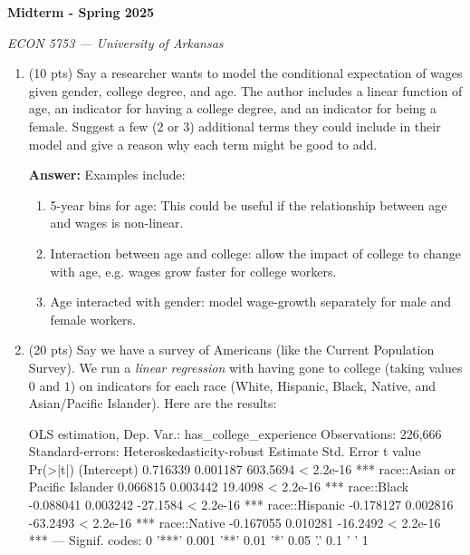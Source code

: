 \documentclass[12pt]{article}
\newcommand{\answer}[1]{{\color{blue_winged_teal}\textbf{Answer:} #1}}
\newcommand{\pts}[1]{{\color{zinc500}(#1 pts)}}
\begin{document}
\begin{center}
  {\Huge\bf Midterm - Spring 2025}

  \smallskip
  {\large\it ECON 5753 — University of Arkansas}
\end{center}

\medskip
\begin{enumerate}
  \item \pts{10} Say a researcher wants to model the conditional expectation of wages given gender, college degree, and age. The author includes a linear function of age, an indicator for having a college degree, and an indicator for being a female. Suggest a few (2 or 3) additional terms they could include in their model and give a reason why each term might be good to add.

  \answer{
    Examples include:
    \begin{enumerate}
      \item 5-year bins for age: This could be useful if the relationship between age and wages is non-linear.

      \item Interaction between age and college: allow the impact of college to change with age, e.g. wages grow faster for college workers.

      \item Age interacted with gender: model wage-growth separately for male and female workers.
    \end{enumerate}
  }

  \bigskip
  \item \pts{20} Say we have a survey of Americans (like the Current Population Survey). We run a \emph{linear regression} with having gone to college (taking values $0$ and $1$) on indicators for each race (White, Hispanic, Black, Native, and Asian/Pacific Islander). Here are the results:
  \begin{codeblock}[{}]
OLS estimation, Dep. Var.: has_college_experience
Observations: 226,666
Standard-errors: Heteroskedasticity-robust
                                 Estimate Std. Error  t value  Pr(>|t|)
(Intercept)                      0.716339   0.001187 603.5694 < 2.2e-16 ***
race::Asian or Pacific Islander  0.066815   0.003442  19.4098 < 2.2e-16 ***
race::Black                     -0.088041   0.003242 -27.1584 < 2.2e-16 ***
race::Hispanic                  -0.178127   0.002816 -63.2493 < 2.2e-16 ***
race::Native                    -0.167055   0.010281 -16.2492 < 2.2e-16 ***
---
Signif. codes:  0 '***' 0.001 '**' 0.01 '*' 0.05 '.' 0.1 ' ' 1
  \end{codeblock}


\end{enumerate}
\end{document}
